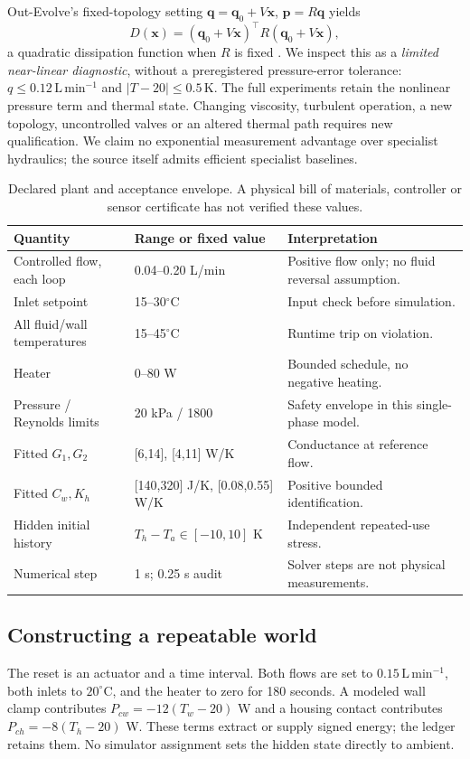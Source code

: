 \documentclass[11pt,letterpaper]{article}
\begin{document}
Out-Evolve's fixed-topology setting $\bm q=\bm q_0+V\bm x$, $\bm p=R\bm q$ yields
\begin{equation}
D(\bm x)=(\bm q_0+V\bm x)^\top R(\bm q_0+V\bm x),
\end{equation}
a quadratic dissipation function when $R$ is fixed \cite[p.5]{outevolve}. We inspect this as a \emph{limited near-linear diagnostic}, without a preregistered pressure-error tolerance: $q\leq0.12\,\mathrm{L\,min^{-1}}$ and $|T-20|\leq0.5\,\mathrm K$. The full experiments retain the nonlinear pressure term and thermal state. Changing viscosity, turbulent operation, a new topology, uncontrolled valves or an altered thermal path requires new qualification. We claim no exponential measurement advantage over specialist hydraulics; the source itself admits efficient specialist baselines.

\begin{table}[ht]
\centering\small
\begin{tabularx}{\linewidth}{@{}p{.29\linewidth}p{.24\linewidth}X@{}}
\toprule
Quantity & Range or fixed value & Interpretation\\\midrule
Controlled flow, each loop & 0.04--0.20 L/min & Positive flow only; no fluid reversal assumption.\\
Inlet setpoint & 15--30$^{\circ}$C & Input check before simulation.\\
All fluid/wall temperatures & 15--45$^{\circ}$C & Runtime trip on violation.\\
Heater & 0--80 W & Bounded schedule, no negative heating.\\
Pressure / Reynolds limits & 20 kPa / 1800 & Safety envelope in this single-phase model.\\
Fitted $G_1,G_2$ & [6,14], [4,11] W/K & Conductance at reference flow.\\
Fitted $C_w,K_h$ & [140,320] J/K, [0.08,0.55] W/K & Positive bounded identification.\\
Hidden initial history & $T_h-T_a\in[-10,10]$ K & Independent repeated-use stress.\\
Numerical step & 1 s; 0.25 s audit & Solver steps are not physical measurements.\\\bottomrule
\end{tabularx}
\caption{Declared plant and acceptance envelope. A physical bill of materials, controller or sensor certificate has not verified these values.}
\end{table}

\subsection{Constructing a repeatable world}
The reset is an actuator and a time interval. Both flows are set to $0.15\,\mathrm{L\,min^{-1}}$, both inlets to $20^{\circ}\mathrm C$, and the heater to zero for 180 seconds. A modeled wall clamp contributes $P_{cw}=-12(T_w-20)$ W and a housing contact contributes $P_{ch}=-8(T_h-20)$ W. These terms extract or supply signed energy; the ledger retains them. No simulator assignment sets the hidden state directly to ambient.
\end{document}
